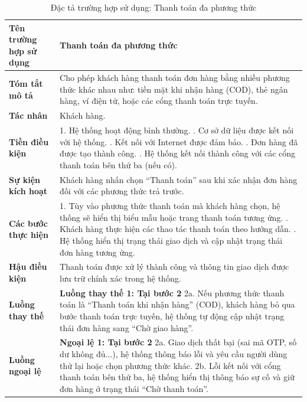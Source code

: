 {
\begin{longtable}{|>{\bfseries}p{4cm}|p{11.5cm}|}
\caption{Đặc tả trường hợp sử dụng: Thanh toán đa phương thức}
\label{tab:uc-multipayment} \\
\hline
\textbf{Tên trường hợp sử dụng} & Thanh toán đa phương thức \\
\hline
\textbf{Tóm tắt mô tả} & Cho phép khách hàng thanh toán đơn hàng bằng nhiều phương thức khác nhau như: tiền mặt khi nhận hàng (COD), thẻ ngân hàng, ví điện tử, hoặc các cổng thanh toán trực tuyến. \\
\hline
\textbf{Tác nhân} & Khách hàng. \\
\hline
\textbf{Tiền điều kiện} & 1. Hệ thống hoạt động bình thường. \newline
2. Cơ sở dữ liệu được kết nối với hệ thống. \newline
3. Kết nối với Internet được đảm bảo. \newline
4. Đơn hàng đã được tạo thành công. \newline
5. Hệ thống kết nối thành công với các cổng thanh toán bên thứ ba (nếu có). \\
\hline
\textbf{Sự kiện kích hoạt} & Khách hàng nhấn chọn “Thanh toán” sau khi xác nhận đơn hàng đối với các phương thức trả trước. \\
\hline
\textbf{Các bước thực hiện} & 1. Tùy vào phương thức thanh toán mà khách hàng chọn, hệ thống sẽ hiển thị biểu mẫu hoặc trang thanh toán tương ứng. \newline
2. Khách hàng thực hiện các thao tác thanh toán theo hướng dẫn. \newline
3. Hệ thống hiển thị trạng thái giao dịch và cập nhật trạng thái đơn hàng tương ứng. \\
\hline
\textbf{Hậu điều kiện} & Thanh toán được xử lý thành công và thông tin giao dịch được lưu trữ chính xác trong hệ thống. \\
\hline
\textbf{Luồng thay thế} & \textbf{Luồng thay thế 1: Tại bước 2} \newline
2a. Nếu phương thức thanh toán là “Thanh toán khi nhận hàng” (COD), khách hàng bỏ qua bước thanh toán trực tuyến, hệ thống tự động cập nhật trạng thái đơn hàng sang “Chờ giao hàng”. \\
\hline
\textbf{Luồng ngoại lệ} & \textbf{Ngoại lệ 1: Tại bước 2} \newline
2a. Giao dịch thất bại (sai mã OTP, số dư không đủ...), hệ thống thông báo lỗi và yêu cầu người dùng thử lại hoặc chọn phương thức khác. \newline
2b. Lỗi kết nối với cổng thanh toán bên thứ ba, hệ thống hiển thị thông báo sự cố và giữ đơn hàng ở trạng thái “Chờ thanh toán”. \\
\hline
\end{longtable}

}

